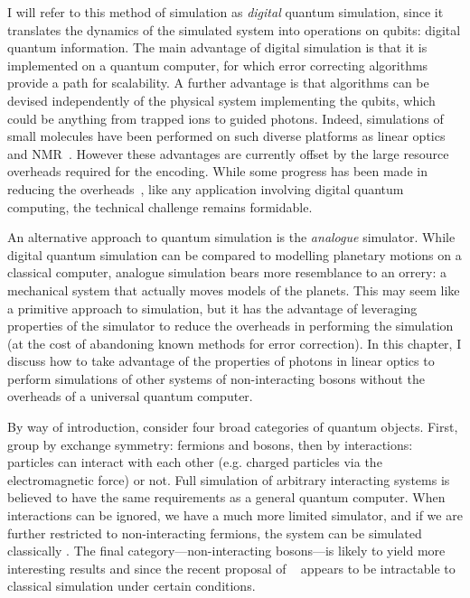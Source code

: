I will refer to this method of simulation as \emph{digital} quantum simulation,
since it translates the dynamics of the simulated system into operations on
qubits: digital quantum information. The main advantage of digital simulation is
that it is implemented on a quantum computer, for which error correcting
algorithms provide a path for scalability. A further advantage is that
algorithms can be devised independently of the physical system implementing the
qubits, which could be anything from trapped ions to guided photons. Indeed,
simulations of small molecules have been performed on such diverse platforms as
linear optics~\cite{qsim-peruzzo} and NMR~\cite{qsim-du}. 
However these advantages are currently offset by the large resource overheads
required for the encoding. While some progress has been made in reducing the
overheads~\cite{qsim-poulin}, like any application involving digital quantum
computing, the technical challenge remains formidable.

An alternative approach to quantum simulation is the \emph{analogue} simulator.
While digital quantum simulation can be compared to modelling planetary motions
on a classical computer, analogue simulation bears more resemblance to an
orrery: a mechanical system that actually moves models of the planets. This may
seem like a primitive approach to simulation, but it has the advantage of
leveraging properties of the simulator to reduce the overheads in performing the
simulation (at the cost of abandoning known methods for error correction). In
this chapter, I discuss how to take advantage of the properties of photons in
linear optics to perform simulations of other systems of non-interacting bosons
without the overheads of a universal quantum computer.

By way of introduction, consider four broad categories of quantum objects.
First, group by exchange symmetry: fermions and bosons, then by interactions:
particles can interact with each other (e.g. charged particles via the
electromagnetic force) or not. Full simulation of arbitrary interacting systems
is believed to have the same requirements as a general quantum computer. When
interactions can be ignored, we have a much more limited simulator, and if we
are further restricted to non-interacting fermions, the system can be simulated
classically . The final category---non-interacting
bosons---is likely to yield more interesting results and since the recent
proposal of \bosonsampling{}~\cite{bosonsampling} appears to be intractable to
classical simulation under certain conditions.

